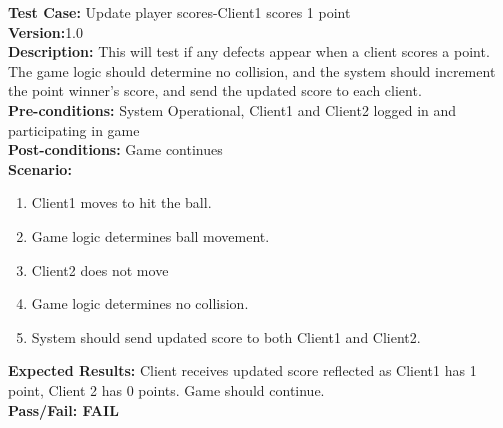\noindent \textbf{Test Case:} Update player scores-Client1 scores 1 point\\
\textbf{Version:}1.0\\
\textbf{Description:} This will test if any defects appear when a client scores a point.  The game logic should determine no collision, and the system should increment the point winner's score, and send the updated score to each client.\\
\textbf{Pre-conditions:} System Operational, Client1 and Client2 logged in and participating in game \\
\textbf{Post-conditions:} Game continues\\
\textbf{Scenario:}
\begin{enumerate}
\item Client1 moves to hit the ball.
\item Game logic determines ball movement.
\item Client2 does not move 
\item Game logic determines no collision. 
\item System should send updated score to both Client1 and Client2.
\end{enumerate}
\textbf{Expected Results:} Client receives updated score reflected as Client1 has 1 point, Client 2 has 0 points.  Game should continue.\\
\textbf{Pass/Fail: FAIL}















